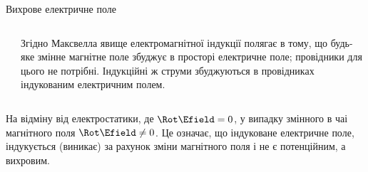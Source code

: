 \documentclass[onlytextwidth]{beamer}
\begin{document}
\begin{frame}{Вихрове електричне поле}{}
\begin{onlyenv}
\begin{columns}
\begin{column}{0.4\linewidth}
\begin{pict}
				\end{pict}
			\end{column}
			\begin{column}{0.6\linewidth}
				\begin{block}{}\justifying\small
					Згідно  Максвелла \alert{явище електромагнітної індукції} полягає в тому, що будь-яке змінне магнітне поле збуджує в просторі
					електричне поле; провідники для цього не потрібні. Індукційні ж струми збуджуються в провідниках індукованим електричним полем.
				\end{block}
			\end{column}
		\end{columns}
		\begin{block}{}\justifying\small
			На відміну від електростатики, де $\Rot\Efield = 0$, у випадку змінного в чаі магнітного поля $ \Rot\Efield \neq 0$. Це означає, що
			індуковане
			електричне поле, індукується (виникає) за рахунок зміни магнітного поля і не є потенційним, а вихровим.
		\end{block}
	\end{onlyenv}
\end{frame}
\end{document}
